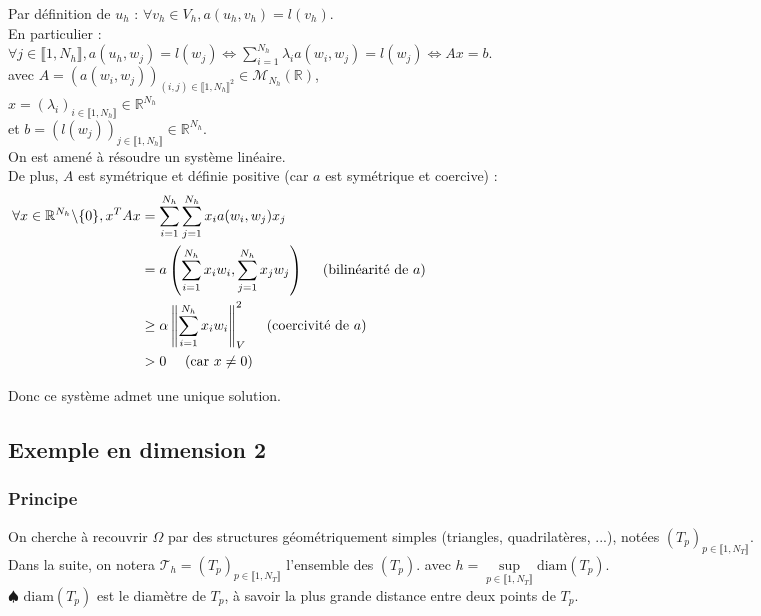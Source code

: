 \documentclass[12pt,a4paper]{article}
\begin{document}
Par définition de $u_h$ : $\forall v_h \in V_h, a(u_h, v_h) = l(v_h)$. \\
En particulier : \\
$\forall j \in \llbracket 1, N_h \rrbracket, a(u_h, w_j) = l(w_j) \Leftrightarrow \sum_{i=1}^{N_h} \lambda_i a(w_i, w_j) = l(w_j) \Leftrightarrow Ax = b$. \\
avec $A = (a(w_i, w_j))_{(i, j) \in \llbracket 1, N_h \rrbracket^2} \in \mathcal{M}_{N_h}(\mathbb{R})$, \\
$x = (\lambda_i)_{i \in \llbracket 1, N_h \rrbracket} \in \mathbb{R}^{N_h}$ \\
et $b = (l(w_j))_{j \in \llbracket 1, N_h \rrbracket} \in \mathbb{R}^{N_h}$. \\

On est amené à résoudre un système linéaire. \\
De plus, $A$ est symétrique et définie positive (car $a$ est symétrique et coercive) :
\begin{align*}
    \forall x \in \mathbb{R}^{N_h} \backslash \{0\}, x^T A x &= \sum_{i=1}^{N_h} \sum_{j=1}^{N_h} x_i a(w_i, w_j) x_j \hspace{14.5cm} \\
    &= a\left(\sum_{i=1}^{N_h} x_i w_i, \sum_{j=1}^{N_h} x_j w_j\right) \quad \text{ (bilinéarité de } a) \\
    &\geq \alpha \left\| \sum_{i=1}^{N_h} x_i w_i \right\|_V^2 \quad \text{ (coercivité de } a) \\
    &> 0 \quad \text{ (car } x \neq 0)
\end{align*}

Donc ce système admet une unique solution. \\


\subsection{Exemple en dimension 2}

\subsubsection{Principe}

On cherche à recouvrir $\Omega$ par des structures géométriquement simples (triangles, quadrilatères, ...), notées $(T_p)_{p \in \llbracket 1, N_T \rrbracket}$. \\
Dans la suite, on notera $\mathcal{T}_h = (T_p)_{p \in \llbracket 1, N_T \rrbracket}$ l'ensemble des $(T_p)$. avec $h = \underset{p \in \llbracket 1, N_T \rrbracket}{\sup} \text{diam}(T_p)$. \\
$\spadesuit \text{ diam}(T_p)$ est le diamètre de $T_p$, à savoir la plus grande distance entre deux points de $T_p$. \\
\end{document}
